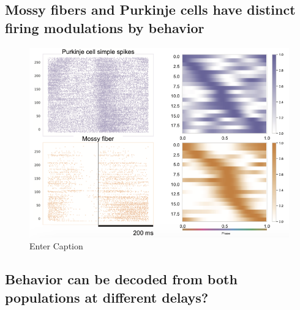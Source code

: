 \subsection{Mossy fibers and Purkinje cells have distinct firing modulations by behavior}

\begin{figure}[h]
    \centering
    \includegraphics[width=.7\linewidth]{Chapters//Figures//chapter5/pkj_mossy_tuning.png}
    \caption{Enter Caption}
    \label{fig:pop_tuning}
\end{figure}

\subsection{Behavior can be decoded from both populations at different delays?}


